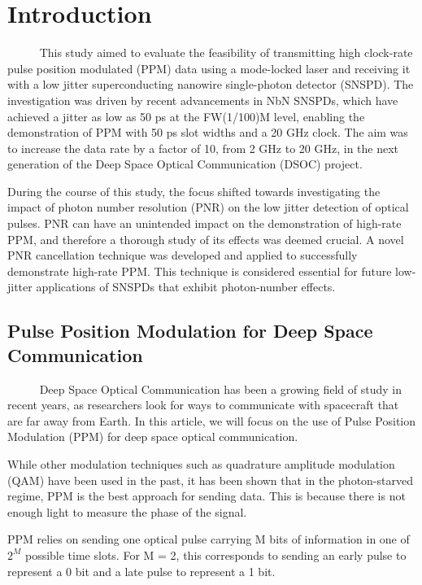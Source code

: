 \documentclass[12pt]{caltech_thesis}
\begin{document}
\hypertarget{introduction-1}{%
\section{Introduction}\label{introduction-1}}

~~~~~ This study aimed to evaluate the feasibility of transmitting high
clock-rate pulse position modulated (PPM) data using a mode-locked laser
and receiving it with a low jitter superconducting nanowire
single-photon detector (SNSPD). The investigation was driven by recent
advancements in NbN SNSPDs, which have achieved a jitter as low as 50 ps
at the FW(1/100)M level, enabling the demonstration of PPM with 50 ps
slot widths and a 20 GHz clock. The aim was to increase the data rate by
a factor of 10, from 2 GHz to 20 GHz, in the next generation of the Deep
Space Optical Communication (DSOC) project.

During the course of this study, the focus shifted towards investigating
the impact of photon number resolution (PNR) on the low jitter detection
of optical pulses. PNR can have an unintended impact on the
demonstration of high-rate PPM, and therefore a thorough study of its
effects was deemed crucial. A novel PNR cancellation technique was
developed and applied to successfully demonstrate high-rate PPM. This
technique is considered essential for future low-jitter applications of
SNSPDs that exhibit photon-number effects.

\hypertarget{pulse-position-modulation-for-deep-space-communication}{%
\subsection{Pulse Position Modulation for Deep Space
Communication}\label{pulse-position-modulation-for-deep-space-communication}}

~~~~~ Deep Space Optical Communication has been a growing field of study
in recent years, as researchers look for ways to communicate with
spacecraft that are far away from Earth. In this article, we will focus
on the use of Pulse Position Modulation (PPM) for deep space optical
communication.

While other modulation techniques such as quadrature amplitude
modulation (QAM) have been used in the past, it has been shown that in
the photon-starved regime, PPM is the best approach for sending data.
This is because there is not enough light to measure the phase of the
signal.

PPM relies on sending one optical pulse carrying M bits of information
in one of \(2^M\) possible time slots. For M = 2, this corresponds to
sending an early pulse to represent a 0 bit and a late pulse to
represent a 1 bit.
\end{document}
